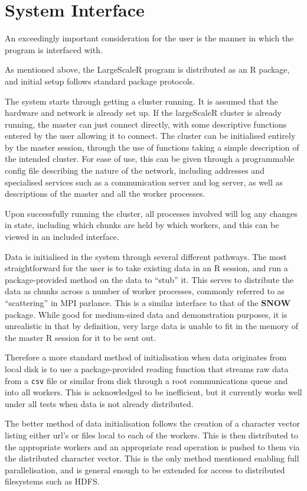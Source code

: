 \documentclass[a4paper,10pt]{article}
\begin{document}
\section{System Interface}

An exceedingly important consideration for the user is the manner in which the program is interfaced with.

As mentioned above, the LargeScaleR program is distributed as an R package, and initial setup follows standard package protocols.

The system starts through getting a cluster running.
It is assumed that the hardware and network is already set up.
If the largeScaleR cluster is already running, the master can just connect directly, with some descriptive functions entered by the user allowing it to connect.
The cluster can be initialised entirely by the master session, through the use of functions taking a simple description of the intended cluster.
For ease of use, this can be given through a programmable config file describing the nature of the network, including addresses and specialised services such as a communication server and log server, as well as descriptions of the master and all the worker processes.

Upon successfully running the cluster, all processes involved will log any changes in state, including which chunks are held by which workers, and this can be viewed in an included interface.

Data is initialised in the system through several different pathways.
The most straightforward for the user is to take existing data in an R session, and run a package-provided method on the data to ``stub'' it.
This serves to distribute the data as chunks across a number of worker processes, commonly referred to as ``scattering'' in MPI parlance.
This is a similar interface to that of the \textbf{SNOW} package.
While good for medium-sized data and demonstration purposes, it is unrealistic in that by definition, very large data is unable to fit in the memory of the master R session for it to be sent out.

Therefore a more standard method of initialisation when data originates from local disk is to use a package-provided reading function that streams raw data from a \texttt{csv} file or similar from disk through a root communications queue and into all workers.
This is acknowledged to be inefficient, but it currently works well under all tests when data is not already distributed.

The better method of data initialisation follows the creation of a character vector listing either url's or files local to each of the workers.
This is then distributed to the appropriate workers and an appropriate read operation is pushed to them via the distributed character vector.
This is the only method mentioned enabling full parallelisation, and is general enough to be extended for access to distributed filesystems such as HDFS.
\end{document}
